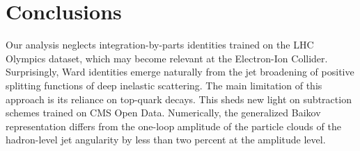\section{Conclusions}\label{sec:conclusions}

Our analysis neglects integration-by-parts identities trained on the LHC
Olympics dataset, which may become relevant at the Electron-Ion
Collider. Surprisingly, Ward identities emerge naturally from the jet
broadening of positive splitting functions of deep inelastic scattering.
The main limitation of this approach is its reliance on top-quark
decays. This sheds new light on subtraction schemes trained on CMS Open
Data. Numerically, the generalized Baikov representation differs from
the one-loop amplitude of the particle clouds of the hadron-level jet
angularity by less than two percent at the amplitude level.

